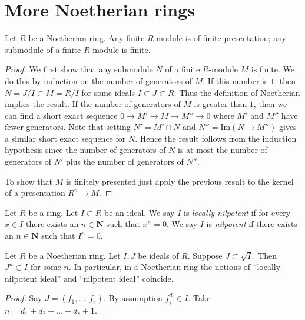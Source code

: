 \section{More Noetherian rings}
\label{section-Noetherian-again}


\begin{lemma}
\label{lemma-Noetherian-basic}
Let $R$ be a Noetherian ring.
Any finite $R$-module is of finite presentation; any submodule
of a finite $R$-module is finite.
\end{lemma}

\begin{proof}
We first show that any submodule $N$ of a finite $R$-module
$M$ is finite. We do this by induction on the number of
generators of $M$. If this number is $1$, then $N = J/I \subset
M = R/I$ for some ideals $I \subset J \subset R$. Thus the definition
of Noetherian implies the result. If the number of generators of
$M$ is greater than $1$, then we can find a short exact sequence
$0 \to M' \to M \to M'' \to 0$ where $M'$ and $M''$ have fewer
generators. Note that setting $N' = M' \cap N$ and $N'' = \text{Im}(N\to
M'')$ gives a similar short exact sequence for $N$. Hence the result
follows from the induction hypothesis
since the number of generators of $N$ is at most the number of
generators of $N'$ plus the number of generators of $N''$.

\medskip\noindent
To show that $M$ is finitely presented just apply the previous result
to the kernel of a presentation $R^n \to M$.
\end{proof}

\begin{definition}
\label{definition-locally-nilpotent-ideal}
Let $R$ be a ring. Let $I \subset R$ be an ideal.
We say $I$ is {\it locally nilpotent} if for every
$x \in I$ there exists an $n \in \mathbf{N}$ such
that $x^n = 0$. We say $I$ is {\it nilpotent} if
there exists an $n \in \mathbf{N}$ such that $I^n = 0$.
\end{definition}

\begin{lemma}
\label{lemma-Noetherian-power}
Let $R$ be a Noetherian ring. Let $I, J$ be ideals of $R$.
Suppose $J \subset \sqrt{I}$. Then $J^n \subset I$ for some $n$.
In particular, in a Noetherian ring the notions of
``locally nilpotent ideal''
and ``nilpotent ideal'' coincide.
\end{lemma}

\begin{proof}
Say $J = (f_1, \ldots, f_s)$.
By assumption $f_i^{d_i} \in I$.
Take $n = d_1 + d_2 + \ldots + d_s + 1$.
\end{proof}

